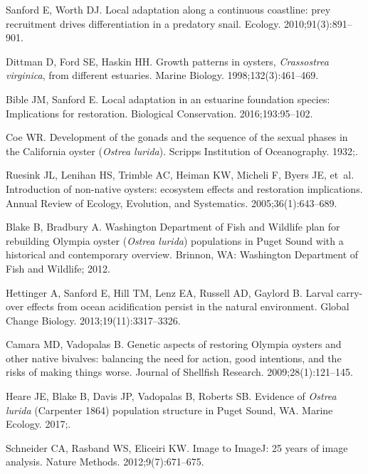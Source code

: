 \documentclass[10pt,letterpaper]{article}
\begin{document}
\begin{thebibliography}{10}
Sanford E, Worth DJ.
\newblock Local adaptation along a continuous coastline: prey recruitment
  drives differentiation in a predatory snail.
\newblock Ecology. 2010;91(3):891--901.

Dittman D, Ford SE, Haskin HH.
\newblock Growth patterns in oysters, \textit{Crassostrea virginica}, from
  different estuaries.
\newblock Marine Biology. 1998;132(3):461--469.

Bible JM, Sanford E.
\newblock Local adaptation in an estuarine foundation species: Implications for
  restoration.
\newblock Biological Conservation. 2016;193:95--102.

Coe WR.
\newblock Development of the gonads and the sequence of the sexual phases in
  the California oyster (\textit{Ostrea lurida}).
\newblock Scripps Institution of Oceanography. 1932;.

Ruesink JL, Lenihan HS, Trimble AC, Heiman KW, Micheli F, Byers JE, et~al.
\newblock Introduction of non-native oysters: ecosystem effects and restoration
  implications.
\newblock Annual Review of Ecology, Evolution, and Systematics. 2005;36(1):643--689.

Blake B, Bradbury A.
\newblock Washington Department of Fish and Wildlife plan for rebuilding
  Olympia oyster (\textit{Ostrea lurida}) populations in Puget Sound with a
  historical and contemporary overview.
\newblock Brinnon, WA: Washington Department of Fish and Wildlife; 2012.

Hettinger A, Sanford E, Hill TM, Lenz EA, Russell AD, Gaylord B.
\newblock Larval carry-over effects from ocean acidification persist in the
  natural environment.
\newblock Global Change Biology. 2013;19(11):3317--3326.

Camara MD, Vadopalas B.
\newblock Genetic aspects of restoring Olympia oysters and other native
  bivalves: balancing the need for action, good intentions, and the risks of
  making things worse.
\newblock Journal of Shellfish Research. 2009;28(1):121--145.

Heare JE, Blake B, Davis JP, Vadopalas B, Roberts SB.
\newblock Evidence of \textit{Ostrea lurida} (Carpenter 1864) population
  structure in Puget Sound, {WA}.
\newblock Marine Ecology. 2017;.

Schneider CA, Rasband WS, Eliceiri KW.
 Image to {ImageJ}: 25 years of image analysis.
\newblock Nature Methods. 2012;9(7):671--675.


\end{thebibliography}
\end{document}
